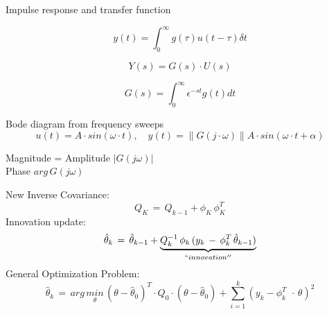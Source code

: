 \begin{tcolorbox}[colback=brown!5!white,colframe=brown!75!black,title=Nonparametric and Frequency Domain Identification Models]
Impulse response and transfer function

\begin{equation*}
y(t)=\int _{ 0 }^{ \infty  }{ g(\tau)u(t-\tau) \delta t } 
\end{equation*}

\begin{equation*}
Y(s)=G(s)\cdot U(s)
\end{equation*}

\begin{equation*}
G(s)=\int _{ 0 }^{ \infty  }{ \epsilon }^{ -st }g(t)dt
\end{equation*}

Bode diagram from frequency sweeps
\begin{equation*}
u(t)=A\cdot sin(\omega \cdot t),\quad y(t)=\parallel G(j\cdot \omega )\parallel A\cdot sin(\omega \cdot t+\alpha )
\end{equation*}
\end{tcolorbox}


\begin{tcolorbox}[colback=brown!5!white,colframe=brown!75!black,title=Bode Diagram:]
Magnitude = Amplitude $|G(j\omega)|$\\
Phase $arg \, G(j\omega)$
\end{tcolorbox}


\begin{tcolorbox}[colback=violet!5!white,colframe=violet!75!black,title=Recursive Least Squares]
New Inverse Covariance:
\begin{equation*}
Q_K \, = \, Q_{k-1} + \phi_K\,\phi_K^T
\end{equation*}
Innovation update:
\begin{equation*}
\hat { \theta  } _{ k }\, =\, \hat { \theta  } _{ k-1 }+\underset { ``innovation'' }{ \underbrace { Q_{ k }^{ -1 }\, \phi _{ k }\, (y_{ k }\, -\, \phi _{ k }^{ T }\, \hat { \theta  } _{ k-1 }) }  } 
\end{equation*}
General Optimization Problem:
\begin{equation*}
\hat { \theta  } _{ k }\, =\, arg\, \underset { \theta  }{ min } \, (\theta -\hat { \theta  } _{ 0 })^{ T }\cdot Q_{ 0 }\cdot (\theta -\hat { \theta  } _{ 0 })+\sum _{ i=1 }^{ k }{ (y_k-\phi_k^T\ \, \cdot \, \theta)^2 } 
\end{equation*}
\end{tcolorbox}

